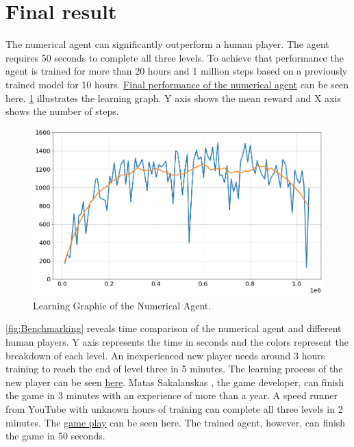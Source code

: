 \documentclass[conference]{IEEEtran}
\begin{document}
\section{Final result}
The numerical agent can significantly outperform a human player. The agent requires 50 seconds to complete all three levels. To achieve that performance the agent is trained for more than 20 hours and 1 million steps based on a previously trained model for 10 hours. \href{https://youtu.be/eR-Nq7dy4qw}{Final performance of the numerical agent} can be seen here. \figurename  \ref{fig:Tensorboard} illustrates the learning graph. Y axis shows the mean reward and X axis shows the number of steps.

\begin{figure}[!t]
  \centering
  \includegraphics[width=1.0\linewidth]{images/tensorboard_2_smooth.png}
  \caption{Learning Graphic of the Numerical Agent.}
\label{fig:Tensorboard}
\end{figure}

\figurename  \ref{fig:Benchmarking} reveals time comparison of the numerical agent and different human players. Y axis represents the time in seconds and the colors represent the breakdown of each level. An inexperienced new player needs around 3 hours training to reach the end of level three in 5 minutes. The learning process of the new player can be seen \href{https://youtu.be/08u6hHvOCj0}{here}. Matas Sakalauskas \cite{Playthrough}, the game developer, can finish the game in 3 minutes with an experience of more than a year. A speed runner from YouTube with unknown hours of training can complete all three levels in 2 minutes. The \href{https://www.youtube.com/watch?v=xL9v7Ss90LU}{game play} can be seen here. The trained agent, however, can finish the game in 50 seconds.
\end{document}

